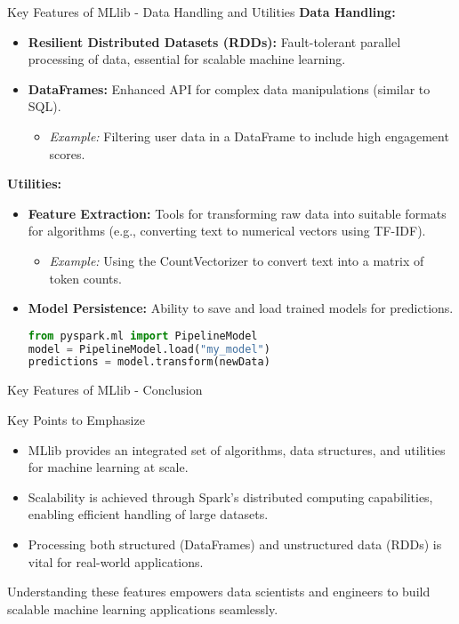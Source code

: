 \documentclass[aspectratio=169]{beamer}
\begin{document}
\begin{frame}[fragile]{Key Features of MLlib - Data Handling and Utilities}
    \textbf{Data Handling:}
    \begin{itemize}
        \item \textbf{Resilient Distributed Datasets (RDDs):} Fault-tolerant parallel processing of data, essential for scalable machine learning.
        \item \textbf{DataFrames:} Enhanced API for complex data manipulations (similar to SQL).
        \begin{itemize}
            \item \textit{Example:} Filtering user data in a DataFrame to include high engagement scores.
        \end{itemize}
    \end{itemize}

    \textbf{Utilities:}
    \begin{itemize}
        \item \textbf{Feature Extraction:} Tools for transforming raw data into suitable formats for algorithms (e.g., converting text to numerical vectors using TF-IDF).
        \begin{itemize}
            \item \textit{Example:} Using the CountVectorizer to convert text into a matrix of token counts.
        \end{itemize}
        
        \item \textbf{Model Persistence:} Ability to save and load trained models for predictions.
        \begin{lstlisting}[language=Python]
from pyspark.ml import PipelineModel
model = PipelineModel.load("my_model")
predictions = model.transform(newData)
        \end{lstlisting}
    \end{itemize}
\end{frame}

\begin{frame}[fragile]{Key Features of MLlib - Conclusion}
    \begin{block}{Key Points to Emphasize}
        \begin{itemize}
            \item MLlib provides an integrated set of algorithms, data structures, and utilities for machine learning at scale.
            \item Scalability is achieved through Spark's distributed computing capabilities, enabling efficient handling of large datasets.
            \item Processing both structured (DataFrames) and unstructured data (RDDs) is vital for real-world applications.
        \end{itemize}
    \end{block}

    Understanding these features empowers data scientists and engineers to build scalable machine learning applications seamlessly.
\end{frame}
\end{document}

